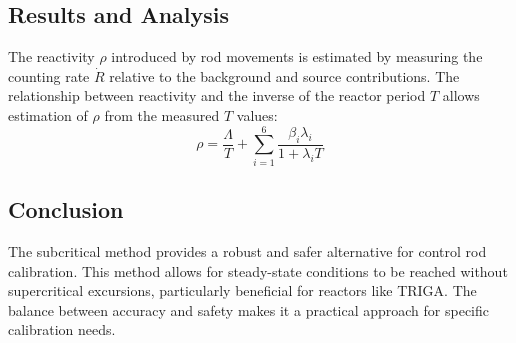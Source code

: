 \subsection{Results and Analysis}
The reactivity $\rho$ introduced by rod movements is estimated by measuring the counting rate $\dot{R}$ relative to the background and source contributions. The relationship between reactivity and the inverse of the reactor period $T$ allows estimation of $\rho$ from the measured $T$ values:
\begin{equation}
    \rho = \frac{\Lambda}{T} + \sum_{i=1}^{6} \frac{\beta_i \lambda_i}{1 + \lambda_i T}
\end{equation}

\subsection{Conclusion}
The subcritical method provides a robust and safer alternative for control rod calibration. This method allows for steady-state conditions to be reached without supercritical excursions, particularly beneficial for reactors like TRIGA. The balance between accuracy and safety makes it a practical approach for specific calibration needs.